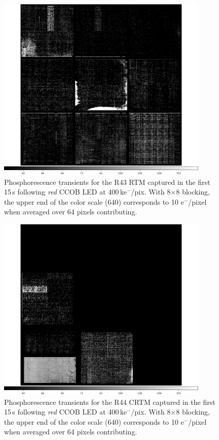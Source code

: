 \begin{figure}[!htbp]
\centering
\includegraphics[width=0.9\textwidth]{sections/figures/phosphorescence-survey/itl_fluor_R43_0-19_rb1_log.png}
\caption{Phosphorescence transients for the R43 RTM captured in the first 15\,s following {\it red} CCOB LED at 400\,ke$^-$/pix. With 8$\times$8 blocking, the upper end of the color scale (640) corresponds to 10 e$^-$/pixel when averaged over 64 pixels contributing.}
\label{fig:phos:R43}
\end{figure}

\begin{figure}[!htbp]
\centering
\includegraphics[width=0.9\textwidth]{sections/figures/phosphorescence-survey/itl_fluor_R44_0-19_rb1_log.png}
\caption{Phosphorescence transients for the R44 CRTM captured in the first 15\,s following {\it red} CCOB LED at 400\,ke$^-$/pix. With 8$\times$8 blocking, the upper end of the color scale (640) corresponds to 10 e$^-$/pixel when averaged over 64 pixels contributing.}
\label{fig:phos:R44}
\end{figure}
